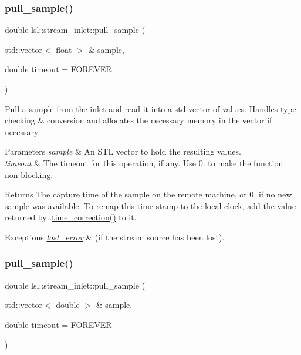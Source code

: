 \subsubsection{\texorpdfstring{pull\+\_\+sample()}{pull\_sample()}\hspace{0.1cm}{\footnotesize\ttfamily [2/15]}}
{\footnotesize\ttfamily double lsl\+::stream\+\_\+inlet\+::pull\+\_\+sample (\begin{DoxyParamCaption}\item[{std\+::vector$<$ float $>$ \&}]{sample,  }\item[{double}]{timeout = {\ttfamily \hyperlink{namespacelsl_a74cfbc9077aca21295117217249721ed}{F\+O\+R\+E\+V\+ER}} }\end{DoxyParamCaption})\hspace{0.3cm}{\ttfamily [inline]}}

Pull a sample from the inlet and read it into a std vector of values. Handles type checking \& conversion and allocates the necessary memory in the vector if necessary. 
\begin{DoxyParams}{Parameters}
{\em sample} & An S\+TL vector to hold the resulting values. \\
\hline
{\em timeout} & The timeout for this operation, if any. Use 0. to make the function non-\/blocking. \\
\hline
\end{DoxyParams}
\begin{DoxyReturn}{Returns}
The capture time of the sample on the remote machine, or 0. if no new sample was available. To remap this time stamp to the local clock, add the value returned by .\hyperlink{classlsl_1_1stream__inlet_a845d95f5fc60fb9cd01fb73d3da75e94}{time\+\_\+correction()} to it. 
\end{DoxyReturn}

\begin{DoxyExceptions}{Exceptions}
{\em \hyperlink{classlsl_1_1lost__error}{lost\+\_\+error}} & (if the stream source has been lost). \\
\hline
\end{DoxyExceptions}
\mbox{\label{classlsl_1_1stream__inlet_a447dd270fa83d8f1df16963b8601027e}} 
\subsubsection{\texorpdfstring{pull\+\_\+sample()}{pull\_sample()}\hspace{0.1cm}{\footnotesize\ttfamily [3/15]}}
{\footnotesize\ttfamily double lsl\+::stream\+\_\+inlet\+::pull\+\_\+sample (\begin{DoxyParamCaption}\item[{std\+::vector$<$ double $>$ \&}]{sample,  }\item[{double}]{timeout = {\ttfamily \hyperlink{namespacelsl_a74cfbc9077aca21295117217249721ed}{F\+O\+R\+E\+V\+ER}} }\end{DoxyParamCaption})\hspace{0.3cm}{\ttfamily [inline]}}

